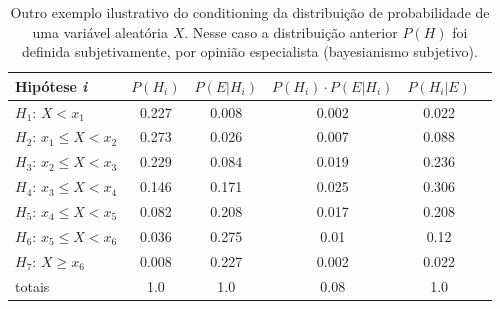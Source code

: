 \documentclass[./main.tex]{subfiles}
\begin{document}
\begin{table}[t]
    \centering	
    \small
    \sffamily
    \begin{tabular}{ l  c  c  c  c c} %
        \toprule
        \textbf{Hipótese \textit{i}} & \textbf{$P(H_i)$} & \textbf{$P(E | H_i)$} & \textbf{$P(H_i) \cdot P(E | H_i)$} & \textbf{$P(H_i | E)$}\\ 
        \midrule
        $H_1$: $X < x_1$ & 0.227 & 0.008 & 0.002 & 0.022\\ 
        $H_2$: $x_1 \leq X < x_2$ & 0.273 & 0.026 & 0.007 & 0.088\\ 
        $H_3$: $x_2 \leq X < x_3$ & 0.229 & 0.084 & 0.019 & 0.236\\ 
        $H_4$: $x_3 \leq X < x_4$ & 0.146 & 0.171 & 0.025 & 0.306\\ 
        $H_5$: $x_4 \leq X < x_5$ & 0.082 & 0.208 & 0.017 & 0.208\\ 
        $H_6$: $x_5 \leq X < x_6$ & 0.036 & 0.275 & 0.01 & 0.12\\ 
        $H_7$: $X \geq x_6$ & 0.008 & 0.227 & 0.002 & 0.022\\ 
        \midrule
        totais & 1.0 & 1.0 & 0.08 & 1.0\\
        \bottomrule
    \end{tabular}
    \caption[Exemplo de \gls{conditioning} subjetivo]{
    Outro exemplo ilustrativo do \gls{conditioning} da distribuição de probabilidade de uma variável aleatória $X$. Nesse caso a distribuição anterior $P(H)$ foi definida subjetivamente, por opinião especialista (bayesianismo subjetivo).
    }
    \label{tbl:subjective}
\end{table}
\end{document}
